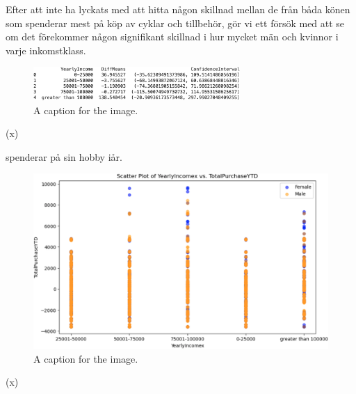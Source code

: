 \documentclass[]{article}
\begin{document}
Efter att inte ha lyckats med att hitta någon skillnad mellan de från båda könen som spenderar mest på köp av cyklar och tillbehör, gör vi ett försök med att se om det förekommer någon signifikant skillnad i hur mycket män och kvinnor i varje inkomstklass.
\begin{figure}[h]
    \centering
    \includegraphics[width=0.7\textwidth]{img_income_classes.png}
    \caption{A caption for the image.}
\end{figure}
\if(x)
\fi
spenderar på sin hobby iår.
\begin{figure}[h]
    \centering
    \includegraphics[width=\textwidth]{img_shopping_habbit_for_income_classes.png}
    \caption{A caption for the image.}
\end{figure}
\if(x)
\end{document}
